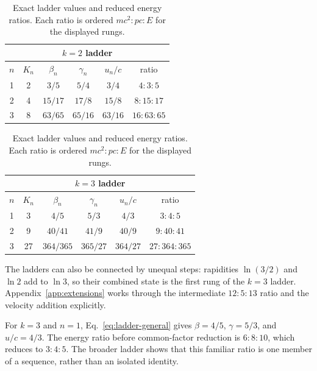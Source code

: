 \documentclass[12pt]{article}
\begin{document}
\begin{table}[ht]
  \centering
  \scriptsize
  \setlength{\tabcolsep}{2.5pt}
  \begin{minipage}[t]{0.49\linewidth}
    \centering
    \begin{tabular}{@{}cccccc@{}}
      \toprule
      \multicolumn{6}{c}{$k=2$ ladder} \\
      \midrule
      $n$ & $K_n$ & $\beta_n$ & $\gamma_n$ & $u_n/c$ & ratio \\
      \midrule
      1 & 2 & $3/5$ & $5/4$ & $3/4$ & $4:3:5$ \\
      2 & 4 & $15/17$ & $17/8$ & $15/8$ & $8:15:17$ \\
      3 & 8 & $63/65$ & $65/16$ & $63/16$ & $16:63:65$ \\
      \bottomrule
    \end{tabular}
  \end{minipage}\hfill
  \begin{minipage}[t]{0.49\linewidth}
    \centering
    \begin{tabular}{@{}cccccc@{}}
      \toprule
      \multicolumn{6}{c}{$k=3$ ladder} \\
      \midrule
      $n$ & $K_n$ & $\beta_n$ & $\gamma_n$ & $u_n/c$ & ratio \\
      \midrule
      1 & 3 & $4/5$ & $5/3$ & $4/3$ & $3:4:5$ \\
      2 & 9 & $40/41$ & $41/9$ & $40/9$ & $9:40:41$ \\
      3 & 27 & $364/365$ & $365/27$ & $364/27$ & $27:364:365$ \\
      \bottomrule
    \end{tabular}
  \end{minipage}
  \caption{Exact ladder values and reduced energy ratios. Each ratio is ordered $mc^2:pc:E$ for the displayed rungs.}
  \label{tab:exact-ladders}
\end{table}

The ladders can also be connected by unequal steps: rapidities $\ln(3/2)$ and $\ln2$ add to $\ln3$, so their combined state is the first rung of the $k=3$ ladder. Appendix~\ref{app:extensions} works through the intermediate $12:5:13$ ratio and the velocity addition explicitly.

For $k=3$ and $n=1$, Eq.~\eqref{eq:ladder-general} gives $\beta=4/5$, $\gamma=5/3$, and $u/c=4/3$. The energy ratio before common-factor reduction is $6:8:10$, which reduces to $3:4:5$. The broader ladder shows that this familiar ratio is one member of a sequence, rather than an isolated identity.
\end{document}

